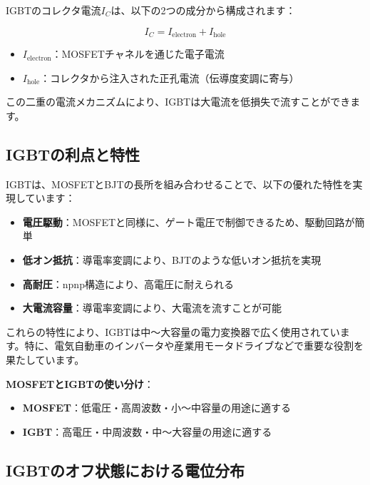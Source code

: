 IGBTのコレクタ電流$I_C$は、以下の2つの成分から構成されます：

\begin{equation}
I_C = I_{\text{electron}} + I_{\text{hole}}
\end{equation}

\begin{itemize}
\item $I_{\text{electron}}$：MOSFETチャネルを通じた電子電流
\item $I_{\text{hole}}$：コレクタから注入された正孔電流（伝導度変調に寄与）
\end{itemize}

この二重の電流メカニズムにより、IGBTは大電流を低損失で流すことができます。

\subsection{IGBTの利点と特性}

IGBTは、MOSFETとBJTの長所を組み合わせることで、以下の優れた特性を実現しています：

\begin{itemize}
\item \textbf{電圧駆動}：MOSFETと同様に、ゲート電圧で制御できるため、駆動回路が簡単
\item \textbf{低オン抵抗}：導電率変調により、BJTのような低いオン抵抗を実現
\item \textbf{高耐圧}：npnp構造により、高電圧に耐えられる
\item \textbf{大電流容量}：導電率変調により、大電流を流すことが可能
\end{itemize}

これらの特性により、IGBTは中～大容量の電力変換器で広く使用されています。特に、電気自動車のインバータや産業用モータドライブなどで重要な役割を果たしています。

\textbf{MOSFETとIGBTの使い分け}：

\begin{itemize}
\item \textbf{MOSFET}：低電圧・高周波数・小～中容量の用途に適する
\item \textbf{IGBT}：高電圧・中周波数・中～大容量の用途に適する
\end{itemize}

\subsection{IGBTのオフ状態における電位分布}

